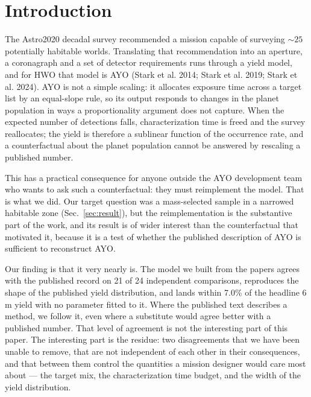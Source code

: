 \documentclass[11pt,a4paper]{article}
\begin{document}
\tableofcontents

\section{Introduction}

The Astro2020 decadal survey recommended a mission capable of surveying $\sim25$ potentially
habitable worlds. Translating that recommendation into an aperture, a coronagraph and a set of
detector requirements runs through a yield model, and for HWO that model is AYO
(Stark et al. 2014; Stark et al. 2019; Stark et al. 2024). AYO is not a simple scaling: it allocates exposure time
across a target list by an equal-slope rule, so its output responds to changes in the planet
population in ways a proportionality argument does not capture. When the expected number of
detections falls, characterization time is freed and the survey reallocates; the yield is
therefore a sublinear function of the occurrence rate, and a counterfactual about the planet
population cannot be answered by rescaling a published number.

This has a practical consequence for anyone outside the AYO development team who wants to ask
such a counterfactual: they must reimplement the model. That is what we did. Our target question
was a mass-selected sample in a narrowed habitable zone (Sec.~\ref{sec:result}), but the
reimplementation is the substantive part of the work, and its result is of wider interest than
the counterfactual that motivated it, because it is a test of whether the published description
of AYO is sufficient to reconstruct AYO.

Our finding is that it very nearly is. The model we built from the papers agrees with the
published record on 21 of 24 independent comparisons, reproduces the shape of the
published yield distribution, and lands within 7.0\% of the headline $6\,$m yield
with no parameter fitted to it. Where the published text describes a method, we follow it, even
where a substitute would agree better with a published number. That level of agreement is not the interesting part of this paper.
The interesting part is the residue: two disagreements that we have been unable to remove, that
are not independent of each other in their consequences, and that between them control the
quantities a mission designer would care most about --- the target mix, the characterization time
budget, and the width of the yield distribution.
\end{document}
